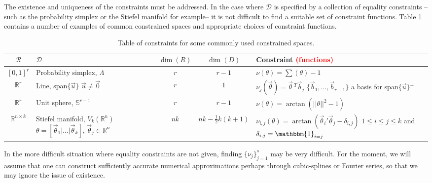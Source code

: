 \documentclass[12 point]{article}
\newcommand{\leo}[1]{\textcolor{red}{ (#1)}}
\begin{document}
The existence and uniqueness of the constraints must be addressed.  In the case where $\mathcal{D}$ is specified by a collection of equality constraints -- such as the probability simplex or the Stiefel manifold for example--  it is not difficult to find a suitable set of constraint functions. Table \ref{TABLE:Equality_constraints_examples} contains a number of examples of common constrained spaces and appropriate choices of constraint functions.
\begin{table}[h!]
\begin{center}
\begin{tabular}{| c | m{4 cm} | c | c | m{6cm} |}
\hline
$\mathcal{R}$ & $\mathcal{D}$ & $\dim(R)$ & $\dim(D)$ & Constraint \leo{functions} \\
\hline
$[0,1]^r$ & Probability simplex, $\Lambda$ & $r$ & $r-1$ & $\nu(\theta) = \sum(\theta) -1$ \\
\hline
$\mathbb{R}^r$ & Line, span$\{\vec{u}\}$ \newline $\vec{u}\ne\vec{0}$ & $r$ & $1$ & $\nu_j(\vec{\theta}) = \vec{\theta}\,^T\vec{b}_j$ \newline $\{\vec{b}_1,\dots,\vec{b}_{r-1}\}$ a basis for span$\{\vec{u}\}^\perp$ \\
\hline
$\mathbb{R}^r$ & Unit sphere, $\mathbb{S}^{r-1}$ & $r$ & $r-1$ & $\nu(\theta) = \arctan(||\theta||^2 -1)$ \\
\hline
$\mathbb{R}^{n\times k}$ & Stiefel manifold, $V_k(\mathbb{R}^n)$ 
\newline $\theta = [\vec{\theta}_1 | \dots | \vec{\theta}_k], \, \vec{\theta}_j \in \mathbb{R}^n$ & $nk$ & $nk - \frac{1}{2}k(k+1)$ & $\nu_{i,j}(\theta) = \arctan( \vec{\theta}_i'\vec{\theta}_j- \delta_{i,j})$ \newline $1\le i \le j \le k$ and $\delta_{i,j} = \mathbbm{1}_{i=j}$ \\

\hline
\end{tabular}
\end{center}
\caption{Table of constraints for some commonly used constrained spaces.}
\label{TABLE:Equality_constraints_examples}
\end{table}

In the more difficult situation where equality constraints are not given, finding $\{\nu_j\}_{j=1}^s$ may be very difficult. For the moment, we will assume that one can construct sufficiently accurate numerical approximations perhaps through cubic-splines or Fourier series, so that we may ignore the issue of existence. 
\end{document}
